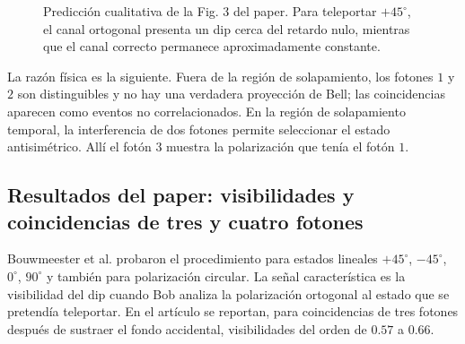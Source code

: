 \documentclass[12pt,a4paper]{article}
\theoremstyle{definition}
\theoremstyle{plain}
\theoremstyle{remark}
\begin{document}
\begin{figure}[htbp]
    \centering
    \shorthandoff{<>}
    \caption{Predicción cualitativa de la Fig. 3 del paper. Para teleportar $+45^\circ$, el canal ortogonal presenta un dip cerca del retardo nulo, mientras que el canal correcto permanece aproximadamente constante.}
    \label{fig:prediccion-dip}
\end{figure}

La razón física es la siguiente. Fuera de la región de solapamiento, los fotones $1$ y $2$ son distinguibles y no hay una verdadera proyección de Bell; las coincidencias aparecen como eventos no correlacionados. En la región de solapamiento temporal, la interferencia de dos fotones permite seleccionar el estado antisimétrico. Allí el fotón $3$ muestra la polarización que tenía el fotón $1$.

\subsection{Resultados del paper: visibilidades y coincidencias de tres y cuatro fotones}

Bouwmeester et al. probaron el procedimiento para estados lineales $+45^\circ$, $-45^\circ$, $0^\circ$, $90^\circ$ y también para polarización circular. La señal característica es la visibilidad del dip cuando Bob analiza la polarización ortogonal al estado que se pretendía teleportar. En el artículo se reportan, para coincidencias de tres fotones después de sustraer el fondo accidental, visibilidades del orden de $0.57$ a $0.66$.
\end{document}

